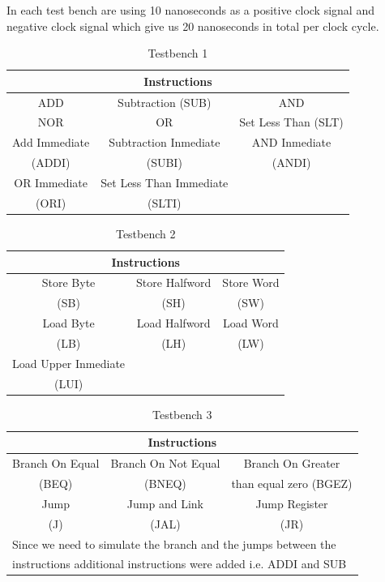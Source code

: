\documentclass[conference]{IEEEtran}
\begin{document}
In each test bench are using 10 nanoseconds as a positive clock signal and negative
clock signal which give us 20 nanoseconds in total per clock cycle.

\begin{table}[htbp]
\caption{Testbench 1} %
\begin{tabular}{|c|c|c|}
\hline
\multicolumn{3}{|c|}{\textbf{Instructions}} \\
\hline
ADD&Subtraction (SUB)&AND  \\
\hline
NOR&OR&Set Less Than (SLT) \\
\hline
Add Immediate&Subtraction Inmediate & AND Inmediate \\
(ADDI) &(SUBI) & (ANDI) \\
\hline
OR Immediate&Set Less Than Immediate&  \\
(ORI)&(SLTI)&  \\
\hline
\end{tabular}
\label{tab_test1}
\end{table}

\begin{table}[t]
\caption{Testbench 2} %
\begin{center}
\begin{tabular}{|c|c|c|}
\hline
\multicolumn{3}{|c|}{\textbf{Instructions}} \\
\hline
Store Byte&Store Halfword&Store Word\\
(SB)&(SH)&(SW)  \\
\hline
Load Byte&Load Halfword&Load Word\\
(LB)&(LH)&(LW) \\
\hline
Load Upper Inmediate&&\\
(LUI)&& \\
\hline
\end{tabular}
\label{tab_test2}
\end{center}
\end{table}

\begin{table}[htbp]
\caption{Testbench 3} %
\begin{center}
\begin{tabular}{|c|c|c|}
\hline
\multicolumn{3}{|c|}{\textbf{Instructions}} \\
\hline
Branch On Equal&Branch On Not Equal&Branch On Greater \\
(BEQ)&(BNEQ)&than equal zero (BGEZ)  \\
\hline
Jump&Jump and Link&Jump Register\\
(J)&(JAL)&(JR) \\
\hline
\multicolumn{3}{l}{Since we need to simulate the branch and the jumps between the} \\
\multicolumn{3}{l}{instructions additional instructions were added i.e. ADDI and  SUB}\\
\end{tabular}
\label{tab_test3}
\end{center}
\end{table}
\end{document}
